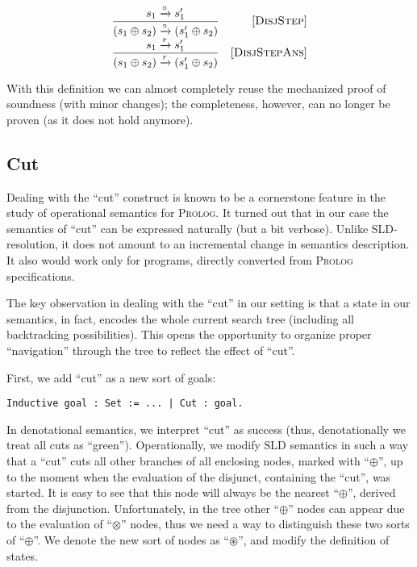 \[
  \begin{array}{cr}
    \dfrac{s_1 \xrightarrow{\circ} s'_1}{(s_1 \oplus s_2) \xrightarrow{\circ} (s'_1 \oplus s_2)} &\mbox{[\textsc{DisjStep}]}\\
    \dfrac{s_1 \xrightarrow{r} s'_1}{(s_1 \oplus s_2) \xrightarrow{r} (s'_1 \oplus s_2)} &\mbox{[\textsc{DisjStepAns}]}
  \end{array}
\]

With this definition we can almost completely reuse the mechanized proof of soundness (with minor changes); the completeness, however,
can no longer be proven (as it does not hold anymore).

\subsection{Cut}

Dealing with the ``cut'' construct is known to be a cornerstone feature in the study of operational semantics for \textsc{Prolog}. It turned out that
in our case the semantics of ``cut'' can be expressed naturally (but a bit verbose). Unlike SLD-resolution, it does not amount to an incremental
change in semantics description. It also would work only for programs, directly converted from \textsc{Prolog} specifications.

The key observation in dealing with the ``cut'' in our setting is that a state in our semantics, in fact, encodes the whole current
search tree (including all backtracking possibilities). This opens the opportunity to organize proper ``navigation'' through the tree
to reflect the effect of ``cut''.

First, we add ``cut'' as a new sort of goals:

\begin{lstlisting}[language=Coq]
  Inductive goal : Set := ... | Cut : goal.
\end{lstlisting}

In denotational semantics, we interpret ``cut'' as success (thus, denotationally we treat all cuts as ``green''). Operationally, we
modify SLD semantics in such a way that a ``cut'' cuts all other branches of all enclosing nodes, marked with ``$\oplus$'', up to
the moment when the evaluation of the disjunct, containing the ``cut'', was started. It is easy to see that this node will always
be the nearest ``$\oplus$'', derived from the disjunction. Unfortunately, in the tree other ``$\oplus$'' nodes can
appear due to the evaluation of ``$\otimes$'' nodes, thus we need a way to distinguish these two sorts of ``$\oplus$''. We
denote the new sort of nodes as ``$\circledast$'', and modify the definition of states.

